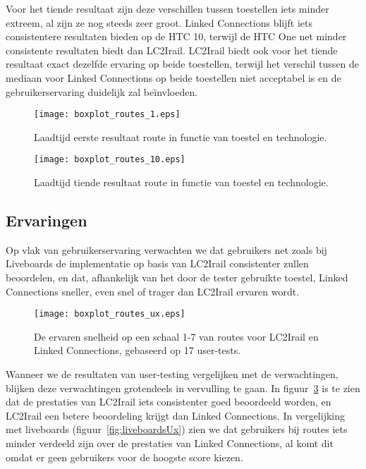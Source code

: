 Voor het tiende resultaat zijn deze verschillen tussen toestellen iets minder extreem, al zijn ze nog steeds zeer groot. Linked Connections blijft iets consistentere resultaten bieden op de HTC 10, terwijl de HTC One net minder consistente resultaten biedt dan LC2Irail. LC2Irail biedt ook voor het tiende resultaat exact dezelfde ervaring op beide toestellen, terwijl het verschil tussen de mediaan voor Linked Connections op beide toestellen niet acceptabel is en de gebruikerservaring duidelijk zal beïnvloeden.

\begin{figure}[h]
	\centering
	\texttt{[image: boxplot\_routes\_1.eps]}
	\caption[Laadtijd eerste resultaat route in functie van toestel en technologie]{Laadtijd eerste resultaat route in functie van toestel en technologie.}
	\label{fig:routesBoxplot1}
\end{figure}

\begin{figure}[h]
	\centering
	\texttt{[image: boxplot\_routes\_10.eps]}
	\caption[Laadtijd tiende resultaat route in functie van toestel en technologie]{Laadtijd tiende resultaat route in functie van toestel en technologie.}
	\label{fig:routesBoxplot10}
\end{figure}

\subsection{Ervaringen}

Op vlak van gebruikerservaring verwachten we dat gebruikers net zoals bij Liveboards de implementatie op basis van LC2Irail consistenter zullen beoordelen, en dat, afhankelijk van het door de tester gebruikte toestel, Linked Connections sneller, even snel of trager dan LC2Irail ervaren wordt.

\begin{figure}[h]
	\centering
	\texttt{[image: boxplot\_routes\_ux.eps]}
	\caption[Ervaren snelheid van routes]{De ervaren snelheid op een schaal 1-7 van routes voor LC2Irail en Linked Connections, gebaseerd op 17 user-tests.}
	\label{fig:routesUx}
\end{figure}

Wanneer we de resultaten van user-testing vergelijken met de verwachtingen, blijken deze verwachtingen grotendeels in vervulling te gaan. In figuur~\ref{fig:routesUx} is te zien dat de prestaties van LC2Irail iets consistenter goed beoordeeld worden, en LC2Irail een betere beoordeling krijgt dan Linked Connections. In vergelijking met liveboards (figuur~\ref{fig:liveboardsUx}) zien we dat gebruikers bij routes iets minder verdeeld zijn over de prestaties van Linked Connections, al komt dit omdat er geen gebruikers voor de hoogste score kiezen. 

